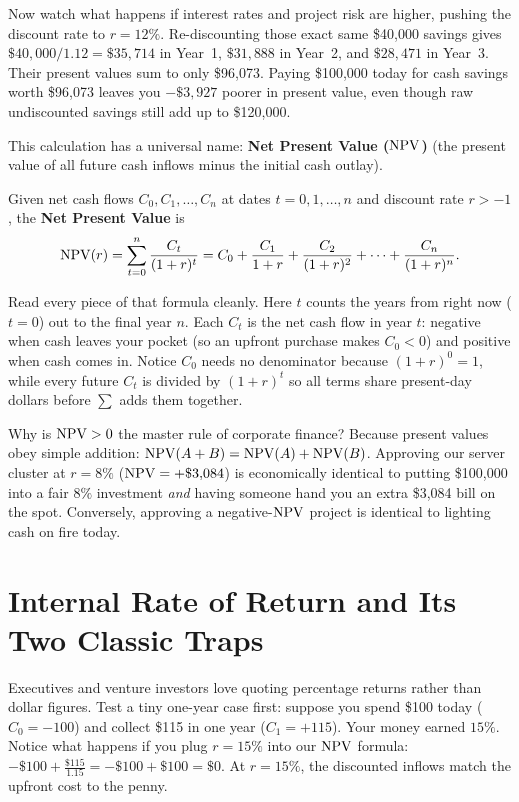 Now watch what happens if interest rates and project risk are higher, pushing the discount rate to $r = 12\%$. Re-discounting those exact same \$40,000 savings gives $\$40{,}000/1.12 = \$35{,}714$ in Year~1, $\$31{,}888$ in Year~2, and $\$28{,}471$ in Year~3. Their present values sum to only \$96,073. Paying \$100,000 today for cash savings worth \$96,073 leaves you $-\$3{,}927$ poorer in present value, even though raw undiscounted savings still add up to \$120,000.

This calculation has a universal name: \textbf{Net Present Value ($\operatorname{NPV}$)} (the present value of all future cash inflows minus the initial cash outlay).

\begin{definition}
Given net cash flows $C_0, C_1, \dots, C_n$ at dates $t = 0, 1, \dots, n$ and discount rate $r > -1$, the \textbf{Net Present Value} is
\[
 \operatorname{NPV}(r) = \sum_{t=0}^{n} \frac{C_t}{(1+r)^t} = C_0 + \frac{C_1}{1+r} + \frac{C_2}{(1+r)^2} + \dots + \frac{C_n}{(1+r)^n}.
\]
\end{definition}

Read every piece of that formula cleanly. Here $t$ counts the years from right now ($t = 0$) out to the final year $n$. Each $C_t$ is the net cash flow in year $t$: negative when cash leaves your pocket (so an upfront purchase makes $C_0 < 0$) and positive when cash comes in. Notice $C_0$ needs no denominator because $(1+r)^0 = 1$, while every future $C_t$ is divided by $(1+r)^t$ so all terms share present-day dollars before $\sum$ adds them together.

\begin{happeningbox}
Why is $\operatorname{NPV} > 0$ the master rule of corporate finance? Because present values obey simple addition: $\operatorname{NPV}(A + B) = \operatorname{NPV}(A) + \operatorname{NPV}(B)$. Approving our server cluster at $r = 8\%$ ($\operatorname{NPV} = +\$3{,}084$) is economically identical to putting \$100,000 into a fair $8\%$ investment \emph{and} having someone hand you an extra \$3,084 bill on the spot. Conversely, approving a negative-$\operatorname{NPV}$ project is identical to lighting cash on fire today.
\end{happeningbox}

\section{Internal Rate of Return and Its Two Classic Traps}

Executives and venture investors love quoting percentage returns rather than dollar figures. Test a tiny one-year case first: suppose you spend \$100 today ($C_0 = -100$) and collect \$115 in one year ($C_1 = +115$). Your money earned $15\%$. Notice what happens if you plug $r = 15\%$ into our $\operatorname{NPV}$ formula: $-\$100 + \frac{\$115}{1.15} = -\$100 + \$100 = \$0$. At $r = 15\%$, the discounted inflows match the upfront cost to the penny.

